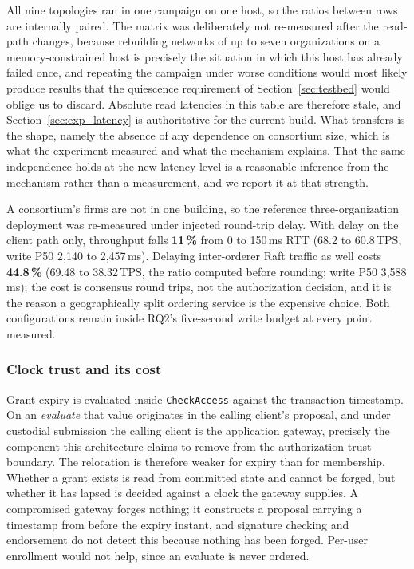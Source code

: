 \documentclass[preprint,12pt]{elsarticle}
\begin{document}
All nine topologies ran in one campaign on one host, so the ratios between
rows are internally paired. The matrix was deliberately not re-measured after
the read-path changes, because rebuilding networks of up to seven
organizations on a memory-constrained host is precisely the situation in which
this host has already failed once, and repeating the campaign under worse
conditions would most likely produce results that the quiescence requirement
of Section~\ref{sec:testbed} would oblige us to discard. Absolute read
latencies in this table are therefore stale, and
Section~\ref{sec:exp_latency} is authoritative for the current build. What
transfers is the shape, namely the absence of any dependence on consortium
size, which is what the experiment measured and what the mechanism explains.
That the same independence holds at the new latency level is a reasonable
inference from the mechanism rather than a measurement, and we report it at
that strength.

A consortium's firms are not in one building, so the reference
three-organization deployment was re-measured under injected round-trip delay. With delay on the client path only, throughput falls
\textbf{11\,\%} from 0 to 150\,ms RTT (68.2 to 60.8\,TPS, write P50 2{,}140 to
2{,}457\,ms). Delaying inter-orderer Raft traffic as well costs
\textbf{44.8\,\%} (69.48 to 38.32\,TPS, the ratio computed before rounding;
write P50 3{,}588\,ms); the cost is consensus
round trips, not the authorization decision, and it is the reason a geographically
split ordering service is the expensive choice. Both configurations remain
inside RQ2's five-second write budget at every point measured.

\subsubsection{Clock trust and its cost}
\label{sec:exp_timeanchor}

Grant expiry is evaluated inside \texttt{CheckAccess} against the transaction
timestamp. On an \emph{evaluate} that value originates in the calling client's
proposal, and under custodial submission the calling client is the application
gateway, precisely the component this architecture claims to remove from the
authorization trust boundary. The relocation is therefore weaker for expiry
than for membership. Whether a grant exists is read from committed state and
cannot be forged, but whether it has lapsed is decided against a clock the
gateway supplies. A compromised gateway forges nothing; it constructs a
proposal carrying a timestamp from before the expiry instant, and signature
checking and endorsement do not detect this because nothing has been forged.
Per-user enrollment would not help, since an evaluate is never ordered.
\end{document}
